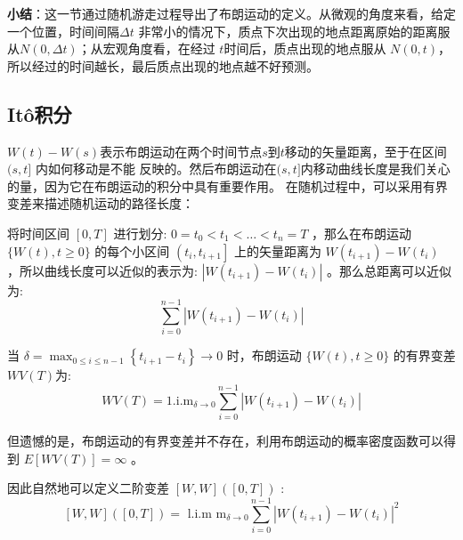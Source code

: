 \textbf{小结}：这一节通过随机游走过程导出了布朗运动的定义。从微观的角度来看，给定一个位置，时间间隔$\Delta t$
非常小的情况下，质点下次出现的地点距离原始的距离服从$N(0, \Delta t)$；从宏观角度看，在经过 
$t$时间后，质点出现的地点服从 $N(0, t)$，所以经过的时间越长，最后质点出现的地点越不好预测。
\subsection{Itô积分}
$W(t) - W(s)$表示布朗运动在两个时间节点$s$到$t$移动的矢量距离，至于在区间 $(s, t]$ 内如何移动是不能
反映的。然后布朗运动在$(s, t]$内移动曲线长度是我们关心的量，因为它在布朗运动的积分中具有重要作用。
在随机过程中，可以采用有界变差来描述随机运动的路径长度： 

将时间区间 $[0, T]$ 进行划分: $0=t_0<t_1<\ldots<t_n=T$ ，那么在布朗运动 $\{W(t), t \geq 0\}$ 的每个小区间 $\left(t_i, t_{i+1}\right]$ 上的矢量距离为 $W\left(t_{i+1}\right)-W\left(t_i\right)$ ，所以曲线长度可以近似的表示为: $\left|W\left(t_{i+1}\right)-W\left(t_i\right)\right|$ 。那么总距离可以近似为:
$$
\sum_{i=0}^{n-1}\left|W\left(t_{i+1}\right)-W\left(t_i\right)\right|
$$

当 $\delta=\max _{0 \leq i \leq n-1}\left\{t_{i+1}-t_i\right\} \rightarrow 0$ 时，布朗运动 $\{W(t), t \geq 0\}$ 的有界变差 $W V(T)$为:
$$
W V(T)=1 . \mathrm{i} . \mathrm{m}_{\delta \rightarrow 0} \sum_{i=0}^{n-1}\left|W\left(t_{i+1}\right)-W\left(t_i\right)\right|
$$

但遗憾的是，布朗运动的有界变差并不存在，利用布朗运动的概率密度函数可以得到 $E[W V(T)]=\infty$ 。

因此自然地可以定义二阶变差 $[W, W]([0, T])$ :
$$
[W, W]([0, T])=\text { l.i.m } \mathrm{m}_{\delta \rightarrow 0} \sum_{i=0}^{n-1}\left|W\left(t_{i+1}\right)-W\left(t_i\right)\right|^2
$$

